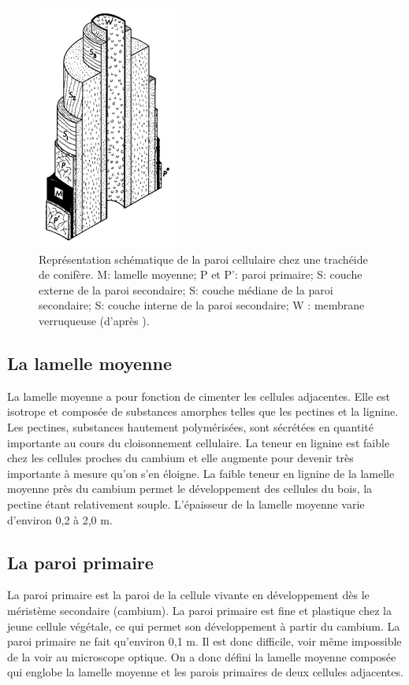 \begin{figure}[h]
	\centering
	\includegraphics[scale=0.7]{img/ch6_couches}
	\caption{Représentation schématique de la paroi cellulaire chez une trachéide de conifère. M: lamelle moyenne; P et P': paroi primaire; S: couche externe de la paroi secondaire; S: couche médiane de la paroi secondaire; S: couche interne de la paroi secondaire; W : membrane verruqueuse (d'après \cite{choong1997wood}).}
\label{fig:couches}
\end{figure}

\subsection{La lamelle moyenne}

La lamelle moyenne a pour fonction de cimenter les cellules adjacentes. Elle est isotrope et composée de substances amorphes telles que les pectines et la lignine. Les pectines, substances hautement polymérisées, sont sécrétées en quantité importante au cours du cloisonnement cellulaire. La teneur en lignine est faible chez les cellules proches du cambium et elle augmente pour devenir très importante à mesure qu'on s'en éloigne. La faible teneur en lignine de la lamelle moyenne près du cambium permet le développement des cellules du bois, la pectine étant relativement souple. L'épaisseur de la lamelle moyenne varie d'environ 0,2 à 2,0 \micro m.

\subsection{La paroi primaire}

La paroi primaire est la paroi de la cellule vivante en développement dès le méristème secondaire (cambium). La paroi primaire est fine et plastique chez la jeune cellule végétale, ce qui permet son développement à partir du cambium. La paroi primaire ne fait qu'environ 0,1 \micro m. Il est donc difficile, voir même impossible de la voir au microscope optique. On a donc défini la lamelle moyenne composée qui englobe la lamelle moyenne et les parois primaires de deux cellules adjacentes.

